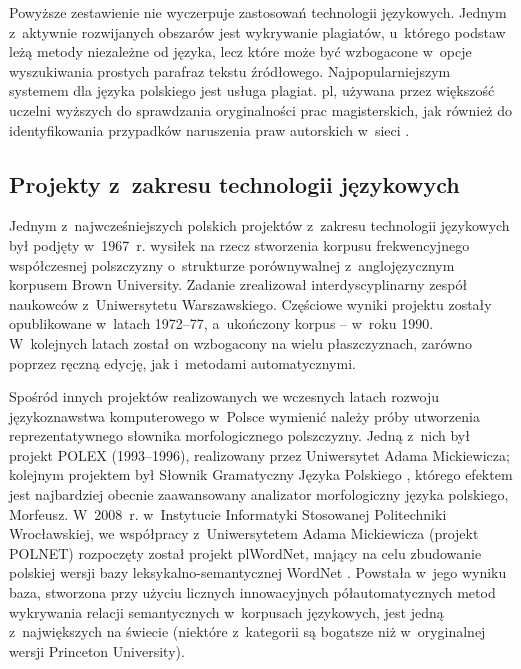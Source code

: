 \begin{multicols}{2}
Powyższe zestawienie nie wyczerpuje zastosowań technologii
językowych. Jednym z~aktywnie rozwijanych obszarów jest wykrywanie
plagiatów, u~którego podstaw leżą metody niezależne od języka,
lecz które może być wzbogacone w~opcje wyszukiwania prostych
parafraz tekstu źródłowego. Najpopularniejszym systemem dla języka
polskiego jest usługa plagiat. pl, używana przez większość
uczelni wyższych do sprawdzania oryginalności prac magisterskich,
jak również do identyfikowania przypadków naruszenia praw
autorskich w~sieci \cite{plagiat1}. 

\subsection[Projekty z~zakresu technologii językowych]{Projekty
z~zakresu technologii językowych} 

Jednym z~najwcześniejszych polskich projektów z~zakresu technologii
językowych był podjęty w~1967~r. wysiłek na rzecz stworzenia
korpusu frekwencyjnego współczesnej polszczyzny o~strukturze
porównywalnej z~anglojęzycznym korpusem Brown University. Zadanie
zrealizował interdyscyplinarny zespół naukowców z~Uniwersytetu
Warszawskiego. Częściowe wyniki projektu zostały opublikowane
w~latach 1972--77, a~ukończony korpus – w~roku 1990. W~kolejnych
latach został on wzbogacony na wielu płaszczyznach, zarówno poprzez
ręczną edycję, jak i~metodami automatycznymi. 

Spośród innych projektów realizowanych we wczesnych latach rozwoju
językoznawstwa komputerowego w~Polsce wymienić należy próby
utworzenia reprezentatywnego słownika morfologicznego polszczyzny.
Jedną z~nich był projekt POLEX (1993--1996), realizowany przez
Uniwersytet Adama Mickiewicza; kolejnym projektem był Słownik
Gramatyczny Języka Polskiego \cite{SGJP}, którego efektem jest
najbardziej obecnie zaawansowany analizator morfologiczny języka
polskiego, Morfeusz. W~2008~r. w~Instytucie Informatyki Stosowanej
Politechniki Wrocławskiej, we współpracy z~Uniwersytetem Adama
Mickiewicza (projekt POLNET) rozpoczęty został projekt plWordNet,
mający na celu zbudowanie polskiej wersji bazy
leksykalno-semantycznej WordNet \cite{Slowosiec1, Piasecki2009}.
Powstała w~jego wyniku baza, stworzona przy użyciu licznych
innowacyjnych półautomatycznych metod wykrywania relacji
semantycznych w~korpusach językowych, jest jedną z~największych na
świecie (niektóre z~kategorii są bogatsze niż w~oryginalnej wersji
Princeton University). 


\end{multicols}
